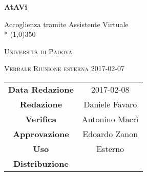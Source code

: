 \documentclass[a4paper,12pt]{article}
\author{Daniele Favaro}
\date{08/02/2017}
\begin{document}
\begin{titlepage}
	\centering
	{\huge\bfseries AtAVi\par}
	Accoglienza tramite Assistente Virtuale \\*
	\line(1,0){350} \\
	{\scshape\LARGE Università di Padova \par}
	\vspace{1cm}
	{\scshape\Large Verbale Riunione esterna 2017-02-07\par}
	\vspace{1.5cm}
	\logo
	\vspace{2cm}	
	\vfill \vfill
	\begin{tabular}{c|c}
		{\hfill\textbf{Data Redazione}} 		& 2017-02-08		\\
		{\hfill\textbf{Redazione}} 			& Daniele Favaro \\
		{\hfill\textbf{Verifica}} 				& Antonino Macrì 	\\
		{\hfill\textbf{Approvazione}} 				& Edoardo Zanon 	\\
		{\hfill\textbf{Uso}} 					& Esterno			\\
		{\hfill\textbf{Distribuzione}} 		& \kpanic\			\\
	\end{tabular}
\end{titlepage}

	\pagestyle{myfront}
	\newpage
	\tableofcontents
	
	\label{LastFrontPage}
	\newpage
	\pagestyle{mymain}
		
		
		
		
		
	
	\label{LastPage}
\end{document}

